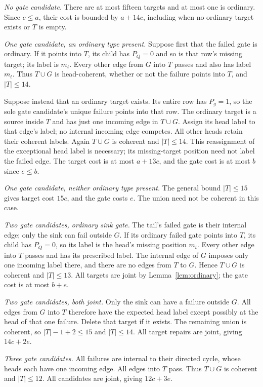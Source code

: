 \documentclass[11pt]{amsart}
\theoremstyle{definition}
\theoremstyle{remark}
\begin{document}
\emph{No gate candidate.}
There are at most fifteen targets and at most one is ordinary. Since
$c\le a$, their cost is bounded by $a+14c$, including when no ordinary
target exists or $T$ is empty.

\emph{One gate candidate, an ordinary type present.}
Suppose first that the failed gate is ordinary. If it points into $T$,
its child has $P_Q=0$ and so is that row's missing target; its label
is $m_t$. Every other edge from $G$ into $T$ passes and also has label
$m_t$. Thus $T\cup G$ is head-coherent, whether or not the failure
points into $T$, and $|T|\le14$.

Suppose instead that an ordinary target exists. Its entire row has
$P_g=1$, so the sole gate candidate's unique failure points into that
row. The ordinary target is a source inside $T$ and has just one
incoming edge in $T\cup G$. Assign its head label to that edge's label;
no internal incoming edge competes. All other heads retain their
coherent labels. Again $T\cup G$ is coherent and $|T|\le14$.
This reassignment of the exceptional head label is necessary; its
missing-target position need not label the failed edge. The target cost
is at most $a+13c$, and the gate cost is at most $b$ since $e\le b$.

\emph{One gate candidate, neither ordinary type present.}
The general bound $|T|\le15$ gives target cost $15c$, and the gate
costs $e$. The union need not be coherent in this case.

\emph{Two gate candidates, ordinary sink gate.}
The tail's failed gate is their internal edge; only the sink can fail
outside $G$. If its ordinary failed gate points into $T$, its child
has $P_Q=0$, so its label is the head's missing position $m_t$.
Every other edge into $T$ passes and has its prescribed label.
The internal edge of $G$ imposes only one incoming label there, and
there are no edges from $T$ to $G$. Hence $T\cup G$ is coherent and
$|T|\le13$. All targets are joint by Lemma~\ref{lem:ordinary}; the
gate cost is at most $b+e$.

\emph{Two gate candidates, both joint.}
Only the sink can have a failure outside $G$. All edges from $G$ into
$T$ therefore have the expected head label except possibly at the head
of that one failure. Delete that target if it exists. The remaining
union is coherent, so $|T|-1+2\le15$ and $|T|\le14$. All target
repairs are joint, giving $14c+2e$.

\emph{Three gate candidates.}
All failures are internal to their directed cycle, whose heads each
have one incoming edge. All edges into $T$ pass. Thus $T\cup G$ is
coherent and $|T|\le12$. All candidates are joint, giving $12c+3e$.
\end{document}
